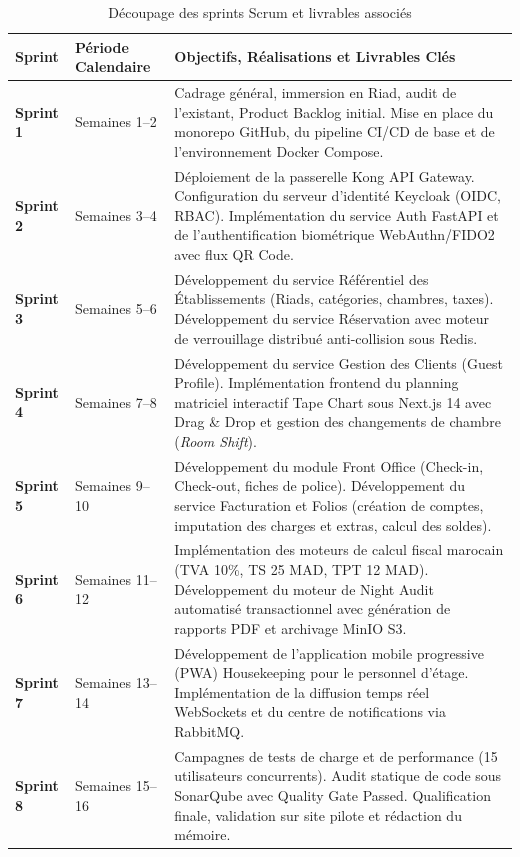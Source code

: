 \documentclass[12pt,a4paper,oneside]{report}
\begin{document}
\begin{table}[H]
\centering
\small
\renewcommand{\arraystretch}{1.3}
\begin{tabularx}{\textwidth}{|p{2.2cm}|p{3.2cm}|X|}
\hline
\textbf{Sprint} & \textbf{Période Calendaire} & \textbf{Objectifs, Réalisations et Livrables Clés} \\
\hline
\textbf{Sprint 1} & Semaines 1--2 & Cadrage général, immersion en Riad, audit de l'existant, Product Backlog initial. Mise en place du monorepo GitHub, du pipeline CI/CD de base et de l'environnement Docker Compose. \\
\hline
\textbf{Sprint 2} & Semaines 3--4 & Déploiement de la passerelle Kong API Gateway. Configuration du serveur d'identité Keycloak (OIDC, RBAC). Implémentation du service Auth FastAPI et de l'authentification biométrique WebAuthn/FIDO2 avec flux QR Code. \\
\hline
\textbf{Sprint 3} & Semaines 5--6 & Développement du service Référentiel des Établissements (Riads, catégories, chambres, taxes). Développement du service Réservation avec moteur de verrouillage distribué anti-collision sous Redis. \\
\hline
\textbf{Sprint 4} & Semaines 7--8 & Développement du service Gestion des Clients (Guest Profile). Implémentation frontend du planning matriciel interactif Tape Chart sous Next.js 14 avec Drag \& Drop et gestion des changements de chambre (\textit{Room Shift}). \\
\hline
\textbf{Sprint 5} & Semaines 9--10 & Développement du module Front Office (Check-in, Check-out, fiches de police). Développement du service Facturation et Folios (création de comptes, imputation des charges et extras, calcul des soldes). \\
\hline
\textbf{Sprint 6} & Semaines 11--12 & Implémentation des moteurs de calcul fiscal marocain (TVA 10\%, TS 25 MAD, TPT 12 MAD). Développement du moteur de Night Audit automatisé transactionnel avec génération de rapports PDF et archivage MinIO S3. \\
\hline
\textbf{Sprint 7} & Semaines 13--14 & Développement de l'application mobile progressive (PWA) Housekeeping pour le personnel d'étage. Implémentation de la diffusion temps réel WebSockets et du centre de notifications via RabbitMQ. \\
\hline
\textbf{Sprint 8} & Semaines 15--16 & Campagnes de tests de charge et de performance (15 utilisateurs concurrents). Audit statique de code sous SonarQube avec Quality Gate Passed. Qualification finale, validation sur site pilote et rédaction du mémoire. \\
\hline
\end{tabularx}
\caption{Découpage des sprints Scrum et livrables associés}
\label{tab:sprints_detail}
\end{table}
\end{document}

